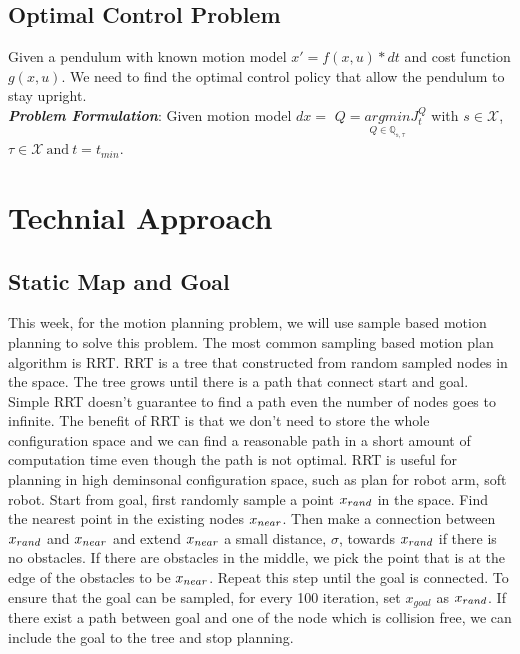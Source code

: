 \documentclass[letterpaper, 10 pt, conference]{ieeeconf}  %
\begin{document}
\subsection{Optimal Control Problem}
Given a pendulum with known motion model $x' = f(x, u) * dt$ and cost function $g(x, u)$. We need to find the optimal control policy that allow the pendulum to stay upright.\\

\textbf{\textit{Problem Formulation}}: 
Given motion model $dx = $
\begin{math}
Q = \underset{Q \in \mathbb{Q_{s,\tau}}}{argmin}J^Q_t
\end{math} with $s\in \mathcal{X}$, $\tau \in \mathcal{X} \ \text{and} \ t = t_{min}$.



\section{Technial Approach}
\subsection{Static Map and Goal}
This week, for the motion planning problem, we will use sample based motion planning to solve this problem. The most common 
sampling based motion plan algorithm is RRT. RRT is a tree that constructed from random sampled nodes in the space. The tree
grows until there is a path that connect start and goal. Simple RRT doesn't guarantee to find a path even the number
of nodes goes to infinite. The benefit of RRT is that we don't need to store the whole configuration space and we can find 
a reasonable path in a short amount of computation time even though the path is not optimal. RRT is useful for planning in 
high deminsonal configuration space, such as plan for robot arm, soft robot. 
Start from goal, first randomly sample a point $x_{rand}$ in the space. Find the nearest point in the existing nodes $x_{near}$.
Then make a connection between $x_{rand}$ and $x_{near}$ and extend $x_{near}$ a small distance, $\sigma$, towards $x_{rand}$ if there is no obstacles.
If there are obstacles in the middle, we pick the point that is at the edge of the obstacles to be $x_{near}$.
Repeat this step until the goal is connected. 
To ensure that the goal can be sampled, for every 100 iteration, set $x_{goal}$ as $x_{rand}$. If there exist a path between goal and 
one of the node which is collision free, we can include the goal to the tree and stop planning. \\
\end{document}
